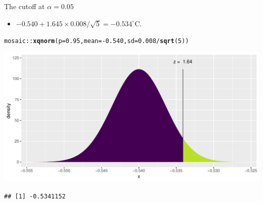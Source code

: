 \documentclass{beamer}\usepackage[]{graphicx}\usepackage[]{color}
\newcommand{\hlnum}[1]{\textcolor[rgb]{0.686,0.059,0.569}{#1}}%
\newcommand{\hlopt}[1]{\textcolor[rgb]{0,0,0}{#1}}%
\newcommand{\hlstd}[1]{\textcolor[rgb]{0.345,0.345,0.345}{#1}}%
\newcommand{\hlkwc}[1]{\textcolor[rgb]{0.333,0.667,0.333}{#1}}%
\newcommand{\hlkwd}[1]{\textcolor[rgb]{0.737,0.353,0.396}{\textbf{#1}}}%
\newenvironment{knitrout}{}{} %
\begin{document}
\begin{frame}[fragile]{The cutoff at $\alpha = 0.05$}
\begin{itemize}
	\item $-0.540 + 1.645 \times 0.008/\sqrt{5}  = -0.534^{\circ}\textrm{C}.$
\end{itemize}

\begin{knitrout}\scriptsize
{}\color{fgcolor}
\begin{alltt}
\hlstd{mosaic}\hlopt{::}\hlkwd{xqnorm}\hlstd{(}\hlkwc{p} \hlstd{=} \hlnum{0.95}\hlstd{,} \hlkwc{mean} \hlstd{=} \hlopt{-}\hlnum{0.540}\hlstd{,} \hlkwc{sd} \hlstd{=} \hlnum{0.008}\hlopt{/}\hlkwd{sqrt}\hlstd{(}\hlnum{5}\hlstd{))}
\end{alltt}


{\centering \includegraphics[width=1\linewidth]{figure/unnamed-chunk-6-1} 

}


\begin{verbatim}
## [1] -0.5341152
\end{verbatim}

\end{knitrout}
\end{frame}
\end{document}
